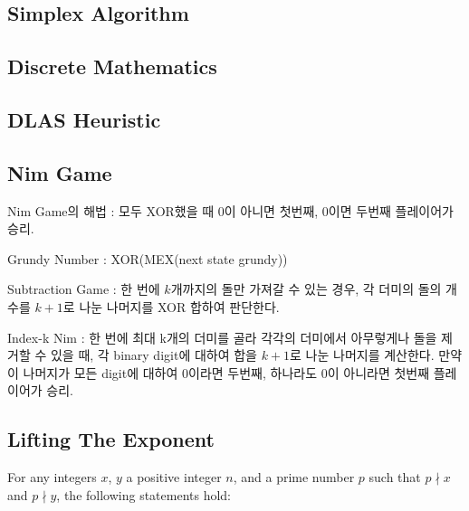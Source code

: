 \documentclass[9pt,landscape,a4paper,twocolumn]{extarticle}
\begin{document}
\subsection{Simplex Algorithm}


\subsection{Discrete Mathematics}


\subsection{DLAS Heuristic}


\subsection{Nim Game}

Nim Game의 해법 : 모두 XOR했을 때 $0$이 아니면 첫번째, $0$이면 두번째 플레이어가 승리.

Grundy Number : XOR(MEX({next state grundy}))

Subtraction Game : 한 번에 $k$개까지의 돌만 가져갈 수 있는 경우,
각 더미의 돌의 개수를 $k + 1$로 나눈 나머지를 XOR 합하여 판단한다.

Index-k Nim : 한 번에 최대 k개의 더미를 골라 각각의 더미에서 아무렇게나 돌을
제거할 수 있을 때, 각 binary digit에 대하여 합을 $k + 1$로 나눈 나머지를 계산한다.
만약 이 나머지가 모든 digit에 대하여 $0$이라면 두번째, 하나라도 $0$이 아니라면
첫번째 플레이어가 승리.

% 

% 
% 

\subsection{Lifting The Exponent}
For any integers $x$, $y$ a positive integer $n$, and a prime number $p$ such that $p \nmid x$ and $p \nmid y$, the following statements hold:
\end{document}
